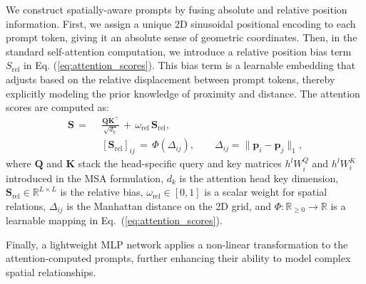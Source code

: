 ﻿\documentclass[letterpaper,journal]{IEEEtran}
\begin{document}
We construct spatially-aware prompts by fusing absolute and relative position information. First, we assign a unique 2D sinusoidal positional encoding to each prompt token, giving it an absolute sense of geometric coordinates. Then, in the standard self-attention computation, we introduce a relative position bias term $S_{\text{rel}}$ in Eq. (\ref{eq:attention_scores}). This bias term is a learnable embedding that adjusts based on the relative displacement between prompt tokens, thereby explicitly modeling the prior knowledge of proximity and distance. The attention scores are computed as:
{\setlength{\abovedisplayskip}{6pt}\setlength{\belowdisplayskip}{6pt}%
\begin{align}
\label{eq:attention_scores}
\mathbf{S}
\,=\, &\; \frac{\mathbf{Q}\mathbf{K}^\top}{\sqrt{d_k}} \, +\, \omega_{\mathrm{rel}}\,\mathbf{S}_{\mathrm{rel}},\\
&\; [\mathbf{S}_{\mathrm{rel}}]_{ij} \,=\, \Phi\!\left(\Delta_{ij}\right),\qquad \Delta_{ij}=\lVert \mathbf{p}_i-\mathbf{p}_j\rVert_1,
\end{align}} where $\mathbf{Q}$ and $\mathbf{K}$ stack the head-specific query and key matrices $h^lW_i^Q$ and $h^lW_i^K$ introduced in the MSA formulation, $d_k$ is the attention head key dimension, $\mathbf{S}_{\mathrm{rel}}\in\mathbb{R}^{L\times L}$ is the relative bias, $\omega_{\mathrm{rel}}\in[0,1]$ is a scalar weight for spatial relations, $\Delta_{ij}$ is the Manhattan distance on the 2D grid, and $\Phi: \mathbb{R}_{\ge 0}\to\mathbb{R}$ is a learnable mapping in Eq.~(\ref{eq:attention_scores}).

Finally, a lightweight MLP network applies a non-linear transformation to the attention-computed prompts, further enhancing their ability to model complex spatial relationships.
\end{document}
